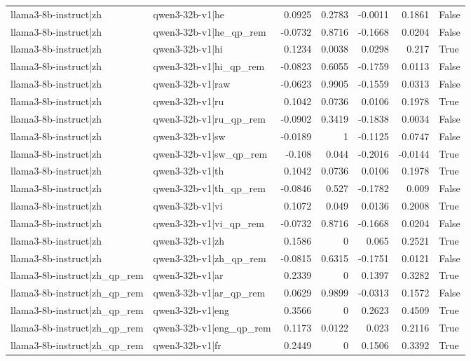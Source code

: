 \begin{table}
\begin{tabular}{l l r r r r l}
llama3-8b-instruct|zh & qwen3-32b-v1|he & 0.0925 & 0.2783 & -0.0011 & 0.1861 & False \\
llama3-8b-instruct|zh & qwen3-32b-v1|he_qp_rem & -0.0732 & 0.8716 & -0.1668 & 0.0204 & False \\
llama3-8b-instruct|zh & qwen3-32b-v1|hi & 0.1234 & 0.0038 & 0.0298 & 0.217 & True \\
llama3-8b-instruct|zh & qwen3-32b-v1|hi_qp_rem & -0.0823 & 0.6055 & -0.1759 & 0.0113 & False \\
llama3-8b-instruct|zh & qwen3-32b-v1|raw & -0.0623 & 0.9905 & -0.1559 & 0.0313 & False \\
llama3-8b-instruct|zh & qwen3-32b-v1|ru & 0.1042 & 0.0736 & 0.0106 & 0.1978 & True \\
llama3-8b-instruct|zh & qwen3-32b-v1|ru_qp_rem & -0.0902 & 0.3419 & -0.1838 & 0.0034 & False \\
llama3-8b-instruct|zh & qwen3-32b-v1|sw & -0.0189 & 1 & -0.1125 & 0.0747 & False \\
llama3-8b-instruct|zh & qwen3-32b-v1|sw_qp_rem & -0.108 & 0.044 & -0.2016 & -0.0144 & True \\
llama3-8b-instruct|zh & qwen3-32b-v1|th & 0.1042 & 0.0736 & 0.0106 & 0.1978 & True \\
llama3-8b-instruct|zh & qwen3-32b-v1|th_qp_rem & -0.0846 & 0.527 & -0.1782 & 0.009 & False \\
llama3-8b-instruct|zh & qwen3-32b-v1|vi & 0.1072 & 0.049 & 0.0136 & 0.2008 & True \\
llama3-8b-instruct|zh & qwen3-32b-v1|vi_qp_rem & -0.0732 & 0.8716 & -0.1668 & 0.0204 & False \\
llama3-8b-instruct|zh & qwen3-32b-v1|zh & 0.1586 & 0 & 0.065 & 0.2521 & True \\
llama3-8b-instruct|zh & qwen3-32b-v1|zh_qp_rem & -0.0815 & 0.6315 & -0.1751 & 0.0121 & False \\
llama3-8b-instruct|zh_qp_rem & qwen3-32b-v1|ar & 0.2339 & 0 & 0.1397 & 0.3282 & True \\
llama3-8b-instruct|zh_qp_rem & qwen3-32b-v1|ar_qp_rem & 0.0629 & 0.9899 & -0.0313 & 0.1572 & False \\
llama3-8b-instruct|zh_qp_rem & qwen3-32b-v1|eng & 0.3566 & 0 & 0.2623 & 0.4509 & True \\
llama3-8b-instruct|zh_qp_rem & qwen3-32b-v1|eng_qp_rem & 0.1173 & 0.0122 & 0.023 & 0.2116 & True \\
llama3-8b-instruct|zh_qp_rem & qwen3-32b-v1|fr & 0.2449 & 0 & 0.1506 & 0.3392 & True \\

\end{tabular}
\end{table}
